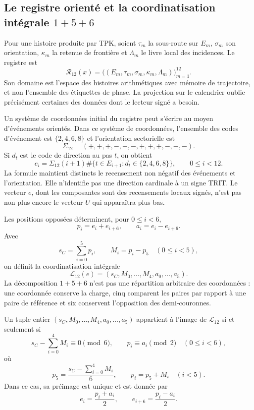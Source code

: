 \subsection{Le registre orienté et la coordinatisation intégrale \texorpdfstring{\(1+5+6\)}{1+5+6}}
\label{subsec:k-registro-integral}

Pour une histoire produite par TPK, soient \(\tau_m\) la sous-route sur
\(E_m\), \(\sigma_m\) son orientation, \(\kappa_m\) la retenue de
frontière et \(\Lambda_m\) le livre local des incidences. Le registre est
\[
 \mathcal R_{12}(x)=
 \bigl((E_m,\tau_m,\sigma_m,\kappa_m,\Lambda_m)\bigr)_{m=1}^{12}.
\]
Son domaine est l'espace des histoires arithmétiques avec mémoire de trajectoire, et non l'ensemble des
étiquettes de phase. La projection sur le calendrier oublie précisément certaines
des données dont le lecteur signé a besoin.

Un système de coordonnées initial du registre peut s’écrire au moyen d’événements
orientés. Dans ce système de coordonnées, l’ensemble des codes d’événement est
\(\{2,4,6,8\}\) et l’orientation sectorielle est
\[
 \Sigma_{12}=(+,+,+,-,-,-,+,+,+,-,-,-).
\]
Si \(d_t\) est le code de direction au pas \(t\), on obtient
\[
 e_i=\Sigma_{12}(i+1)
 \#\{t\in E_{i+1}:d_t\in\{2,4,6,8\}\},
 \qquad0\leq i<12.
\]
La formule maintient distincts le recensement non négatif des événements et
l'orientation. Elle n'identifie pas une direction cardinale à un signe TRIT. Le
vecteur \(e\), dont les composantes sont des recensements locaux signés, n'est pas non plus
encore le vecteur \(U\) qui apparaîtra plus bas.

Les positions opposées déterminent, pour \(0\leq i<6\),
\[
 p_i=e_i+e_{i+6},\qquad a_i=e_i-e_{i+6}.
\]
Avec
\[
 s_C=\sum_{i=0}^{5}p_i,\qquad M_i=p_i-p_5\quad(0\leq i<5),
\]
on définit la coordinatisation intégrale
\[
 \mathcal L_{12}(e)
 =(s_C,M_0,\ldots,M_4,a_0,\ldots,a_5).
\]
La décomposition \(1+5+6\) n'est pas une répartition arbitraire des coordonnées :
une coordonnée conserve la charge, cinq comparent les paires par rapport à une
paire de référence et six conservent l'opposition des demi-couronnes.

\begin{lemma}
\label{lem:k-carta-integral}
Un tuple entier \((s_C,M_0,\ldots,M_4,a_0,\ldots,a_5)\) appartient à l'image de \(\mathcal L_{12}\) si et seulement si
\[
 s_C-\sum_{i=0}^{4}M_i\equiv0\pmod6,
 \qquad p_i\equiv a_i\pmod2\quad(0\leq i<6),
\]
où
\[
 p_5=\frac{s_C-\sum_{i=0}^{4}M_i}{6},\qquad p_i=p_5+M_i\quad(i<5).
\]
Dans ce cas, sa préimage est unique et est donnée par
\[
 e_i=\frac{p_i+a_i}{2},\qquad e_{i+6}=\frac{p_i-a_i}{2}.
\]
\end{lemma}

